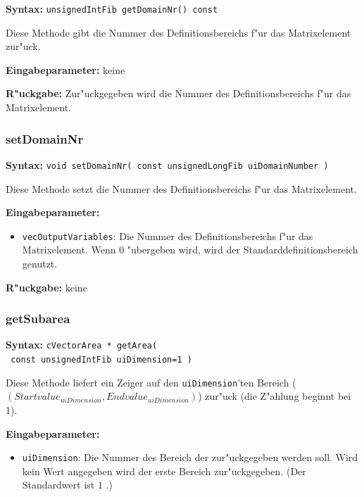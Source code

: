 \textbf{Syntax:} \verb|unsignedIntFib getDomainNr() const|

\bigskip\noindent
Diese Methode gibt die Nummer des Definitionsbereichs f"ur das Matrixelement zur"uck.

\bigskip\noindent
\textbf{Eingabeparameter:} keine

\bigskip\noindent
\textbf{R"uckgabe:} Zur"uckgegeben wird die Nummer des Definitionsbereichs f"ur das Matrixelement.


\subsubsection{setDomainNr}

\textbf{Syntax:} \verb|void setDomainNr( const unsignedLongFib uiDomainNumber )|

\bigskip\noindent
Diese Methode setzt die Nummer des Definitionsbereichs f"ur das Matrixelement.

\bigskip\noindent
\textbf{Eingabeparameter:}
\begin{itemize}
 \item \verb|vecOutputVariables|: Die Nummer des Definitionsbereichs f"ur das Matrixelement. Wenn $0$ "ubergeben wird, wird der Standarddefinitionsbereich genutzt.
\end{itemize}

\bigskip\noindent
\textbf{R"uckgabe:} keine


\subsubsection{getSubarea}

\textbf{Syntax:} \verb|cVectorArea * getArea(| \\\verb| const unsignedIntFib uiDimension=1 )|

\bigskip\noindent
Diese Methode liefert ein Zeiger auf den \verb|uiDimension|'ten Bereich ($(Startvalue_{uiDimension}, Endvalue_{uiDimension})$) zur"uck (die Z"ahlung beginnt bei 1).

\bigskip\noindent
\textbf{Eingabeparameter:}
\begin{itemize}
 \item \verb|uiDimension|: Die Nummer des Bereich der zur"uckgegeben werden soll. Wird kein Wert angegeben wird der erste Bereich zur"uckgegeben. (Der Standardwert ist $1$ .)
\end{itemize}

